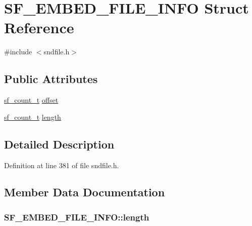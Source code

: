 \hypertarget{struct_s_f___e_m_b_e_d___f_i_l_e___i_n_f_o}{}\section{S\+F\+\_\+\+E\+M\+B\+E\+D\+\_\+\+F\+I\+L\+E\+\_\+\+I\+N\+FO Struct Reference}
\label{struct_s_f___e_m_b_e_d___f_i_l_e___i_n_f_o}


{\ttfamily \#include $<$sndfile.\+h$>$}

\subsection*{Public Attributes}
\begin{DoxyCompactItemize}
\item 
\hyperlink{mac_2config_2i386_2lib-src_2libsndfile_2src_2sndfile_8h_a398121a5f562230ea7f772528fff5f84}{sf\+\_\+count\+\_\+t} \hyperlink{struct_s_f___e_m_b_e_d___f_i_l_e___i_n_f_o_a3f9c37d1a474485d613276656e31d591}{offset}
\item 
\hyperlink{mac_2config_2i386_2lib-src_2libsndfile_2src_2sndfile_8h_a398121a5f562230ea7f772528fff5f84}{sf\+\_\+count\+\_\+t} \hyperlink{struct_s_f___e_m_b_e_d___f_i_l_e___i_n_f_o_a877c809e76ebbec7c45da688ff0109e8}{length}
\end{DoxyCompactItemize}


\subsection{Detailed Description}


Definition at line 381 of file sndfile.\+h.



\subsection{Member Data Documentation}
\subsubsection[{\texorpdfstring{length}{length}}]{ S\+F\+\_\+\+E\+M\+B\+E\+D\+\_\+\+F\+I\+L\+E\+\_\+\+I\+N\+F\+O\+::length}\hypertarget{struct_s_f___e_m_b_e_d___f_i_l_e___i_n_f_o_a877c809e76ebbec7c45da688ff0109e8}{}\label{struct_s_f___e_m_b_e_d___f_i_l_e___i_n_f_o_a877c809e76ebbec7c45da688ff0109e8}


